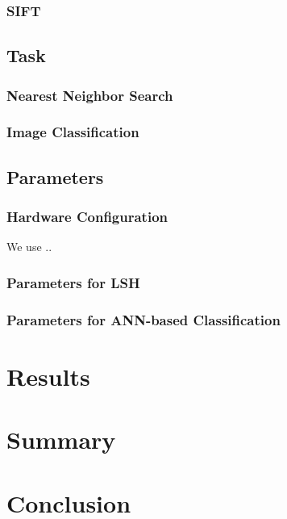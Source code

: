 \documentclass[letterpaper,twocolumn,10pt]{article}
\theoremstyle{definition}
\begin{document}
\subsubsection{SIFT}
\cite{jegou2011product}

\subsection{Task}
\subsubsection{Nearest Neighbor Search}
\subsubsection{Image Classification}
\subsection{Parameters}
\subsubsection{Hardware Configuration}
We use ..

\subsubsection{Parameters for LSH}
\subsubsection{Parameters for ANN-based Classification}

\section{Results}

\section{Summary}


\section{Conclusion}


{\footnotesize 
}
\end{document}
